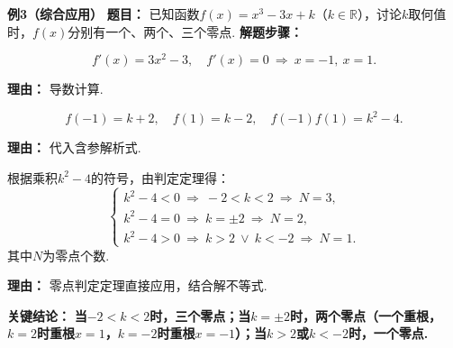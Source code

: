 \begin{examplebox}
	\medskip
	\textbf{\textcolor{CExample}{例3（综合应用）}}
	\textbf{\textcolor{CExample}{题目：}}
	已知函数\(f(x)=x^3-3x+k\)（\(k\in\mathbb{R}\)），讨论\(k\)取何值时，\(f(x)\)分别有一个、两个、三个零点.
	\textbf{\textcolor{CExample}{解题步骤：}}
	\begin{description}[style=nextline, leftmargin=2.8em, labelsep=0.5em, itemsep=0.45em]
		\item[\textbf{第一步（求导与极值点）：}]
			\[
				f'(x)=3x^2-3,\quad f'(x)=0\ \Rightarrow\ x=-1,\ x=1.
			\]
			\par\textbf{理由：} 导数计算.
		\item[\textbf{第二步（极值乘积）：}]
			\[
				f(-1)=k+2,\quad f(1)=k-2,\quad f(-1)f(1)=k^2-4.
			\]
			\par\textbf{理由：} 代入含参解析式.
		\item[\textbf{第三步（分类讨论零点个数）：}]
			根据乘积\(k^2-4\)的符号，由判定定理得：
			\[
				\begin{cases}
					k^2-4<0\ \Rightarrow\ -2<k<2\ \Rightarrow\ N=3,\\ k^2-4=0\ \Rightarrow\ k=\pm2\ \Rightarrow\ N=2,\\ k^2-4>0\ \Rightarrow\ k>2\ \vee\ k<-2\ \Rightarrow\ N=1.
			\end{cases}
			\]
			其中\(N\)为零点个数.
			\par\textbf{理由：} 零点判定定理直接应用，结合解不等式.
	\end{description}
	\textbf{\textcolor{CExample}{关键结论：}}
	\textbf{当\(-2<k<2\)时，三个零点；当\(k=\pm2\)时，两个零点（一个重根，\(k=2\)时重根\(x=1\)，\(k=-2\)时重根\(x=-1\)）；当\(k>2\)或\(k<-2\)时，一个零点.}
\end{examplebox}
